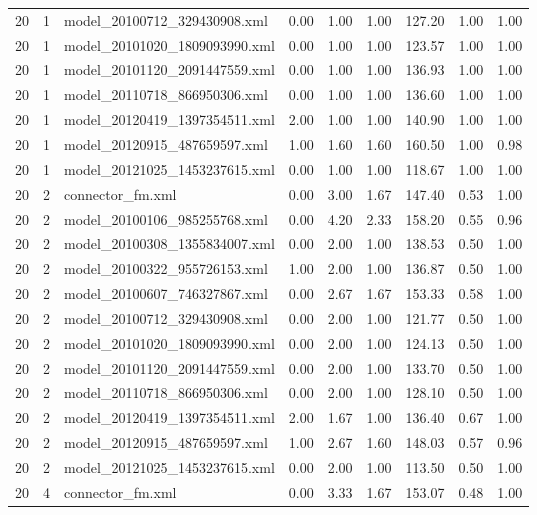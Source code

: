 \begin{table}[ht]
\begin{tabular}{rrlrrrrrr}
   20 &   1 & model\_20100712\_329430908.xml & 0.00 & 1.00 & 1.00 & 127.20 & 1.00 & 1.00 \\ 
   20 &   1 & model\_20101020\_1809093990.xml & 0.00 & 1.00 & 1.00 & 123.57 & 1.00 & 1.00 \\ 
   20 &   1 & model\_20101120\_2091447559.xml & 0.00 & 1.00 & 1.00 & 136.93 & 1.00 & 1.00 \\ 
   20 &   1 & model\_20110718\_866950306.xml & 0.00 & 1.00 & 1.00 & 136.60 & 1.00 & 1.00 \\ 
   20 &   1 & model\_20120419\_1397354511.xml & 2.00 & 1.00 & 1.00 & 140.90 & 1.00 & 1.00 \\ 
   20 &   1 & model\_20120915\_487659597.xml & 1.00 & 1.60 & 1.60 & 160.50 & 1.00 & 0.98 \\ 
   20 &   1 & model\_20121025\_1453237615.xml & 0.00 & 1.00 & 1.00 & 118.67 & 1.00 & 1.00 \\ 
   20 &   2 & connector\_fm.xml & 0.00 & 3.00 & 1.67 & 147.40 & 0.53 & 1.00 \\ 
   20 &   2 & model\_20100106\_985255768.xml & 0.00 & 4.20 & 2.33 & 158.20 & 0.55 & 0.96 \\ 
   20 &   2 & model\_20100308\_1355834007.xml & 0.00 & 2.00 & 1.00 & 138.53 & 0.50 & 1.00 \\ 
   20 &   2 & model\_20100322\_955726153.xml & 1.00 & 2.00 & 1.00 & 136.87 & 0.50 & 1.00 \\ 
   20 &   2 & model\_20100607\_746327867.xml & 0.00 & 2.67 & 1.67 & 153.33 & 0.58 & 1.00 \\ 
   20 &   2 & model\_20100712\_329430908.xml & 0.00 & 2.00 & 1.00 & 121.77 & 0.50 & 1.00 \\ 
   20 &   2 & model\_20101020\_1809093990.xml & 0.00 & 2.00 & 1.00 & 124.13 & 0.50 & 1.00 \\ 
   20 &   2 & model\_20101120\_2091447559.xml & 0.00 & 2.00 & 1.00 & 133.70 & 0.50 & 1.00 \\ 
   20 &   2 & model\_20110718\_866950306.xml & 0.00 & 2.00 & 1.00 & 128.10 & 0.50 & 1.00 \\ 
   20 &   2 & model\_20120419\_1397354511.xml & 2.00 & 1.67 & 1.00 & 136.40 & 0.67 & 1.00 \\ 
   20 &   2 & model\_20120915\_487659597.xml & 1.00 & 2.67 & 1.60 & 148.03 & 0.57 & 0.96 \\ 
   20 &   2 & model\_20121025\_1453237615.xml & 0.00 & 2.00 & 1.00 & 113.50 & 0.50 & 1.00 \\ 
   20 &   4 & connector\_fm.xml & 0.00 & 3.33 & 1.67 & 153.07 & 0.48 & 1.00 \\ 

\end{tabular}
\end{table}
